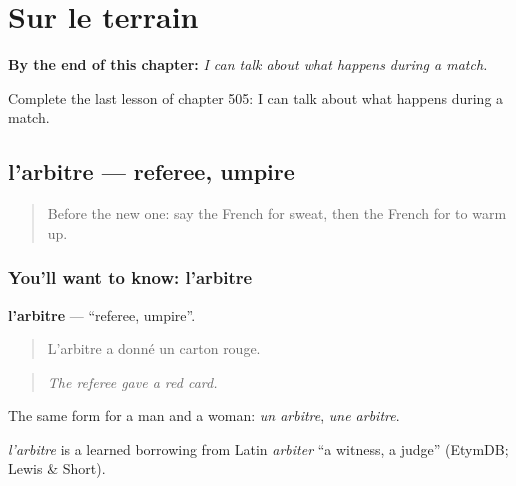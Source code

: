 
\chapter{Sur le terrain}
\label{ch:fr-sur-le-terrain}

\begin{chapteropening}
\textbf{By the end of this chapter:} \emph{I can talk about what happens during a match.}

Complete the last lesson of chapter 505: I can talk about what happens during a match.
\end{chapteropening}

\section[l'arbitre]{l'arbitre — referee, umpire}

\label{lesson:FR-C505-arbitre}



\begin{quote}
Before the new one: say the French for sweat, then the French for to warm up.
\end{quote}

\subsection*{You'll want to know: l'arbitre}
\textbf{l'arbitre} — \textquotedblleft{}referee, umpire\textquotedblright{}.

\begin{quote}
L'arbitre a donné un carton rouge.
\end{quote}

\begin{quote}
\emph{The referee gave a red card.}
\end{quote}

The same form for a man and a woman: \emph{un arbitre}, \emph{une arbitre}.

\begin{cousinweb}
\emph{l'arbitre} is a learned borrowing from Latin \emph{arbiter} \textquotedblleft{}a witness, a judge\textquotedblright{} (EtymDB; Lewis \& Short).
\end{cousinweb}

